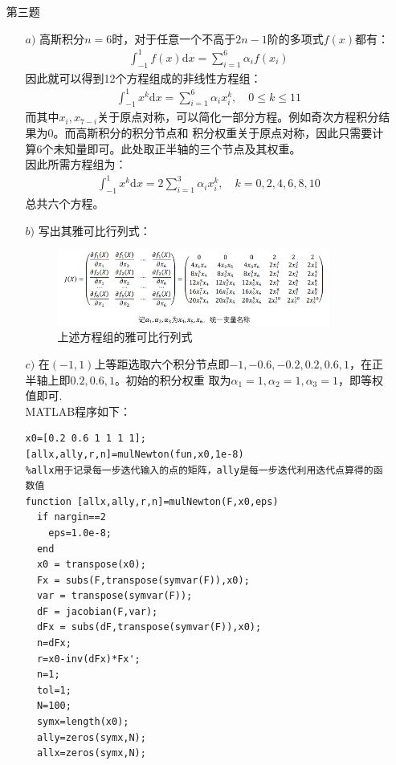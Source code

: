 \documentclass[12pt,a4paper,utf8]{ctexart}
\begin{document}
\begin{enumerate}
\begin{enumerate}
  \end{enumerate}


\item[第三题]
      \begin{enumerate}
        \item[$a)$] 高斯积分$n=6$时，对于任意一个不高于$2n-1$阶的多项式$f(x)$都有：
            \begin{eqnarray} 
                \int_{-1}^{1}f(x)\mathrm{d}x=\sum_{i=1}^{6}\alpha_{i}f(x_{i})
            \end{eqnarray}
            因此就可以得到12个方程组成的非线性方程组：
            \begin{eqnarray} 
                \int_{-1}^{1}x^{k}\mathrm{d}x=\sum_{i=1}^{6}\alpha_{i}x_{i}^{k}, \quad  0\leq k\leq 11
            \end{eqnarray}
            而其中$x_{i},x_{7-i}$关于原点对称，可以简化一部分方程。例如奇次方程积分结果为0。而高斯积分的积分节点和
            积分权重关于原点对称，因此只需要计算6个未知量即可。此处取正半轴的三个节点及其权重。\\
            因此所需方程组为：
            \begin{eqnarray} 
                \int_{-1}^{1}x^{k}\mathrm{d}x=2\sum_{i=1}^{3}\alpha_{i}x_{i}^{k}, \quad   k=0,2,4,6,8,10
            \end{eqnarray}
            总共六个方程。
        \item[$b)$] 写出其雅可比行列式：
            \begin{figure}[h]
                 \centering
                 \includegraphics[width=0.9\textwidth]{H3T3B.png}
                 \caption{上述方程组的雅可比行列式}
            \end{figure}
        \item[$c)$] 在$(-1,1)$上等距选取六个积分节点即$-1,-0.6,-0.2,0.2,0.6,1$，在正半轴上即$0.2,0.6,1$。初始的积分权重
                取为$\alpha_{1}=1,\alpha_{2}=1,\alpha_{3}=1$，即等权值即可.\\
                MATLAB程序如下：
            \begin{lstlisting}[frame=single]
x0=[0.2 0.6 1 1 1 1];
[allx,ally,r,n]=mulNewton(fun,x0,1e-8)
%allx用于记录每一步迭代输入的点的矩阵，ally是每一步迭代利用迭代点算得的函数值
function [allx,ally,r,n]=mulNewton(F,x0,eps)
  if nargin==2
    eps=1.0e-8;
  end
  x0 = transpose(x0);
  Fx = subs(F,transpose(symvar(F)),x0);
  var = transpose(symvar(F));
  dF = jacobian(F,var);
  dFx = subs(dF,transpose(symvar(F)),x0);
  n=dFx;
  r=x0-inv(dFx)*Fx';
  n=1;
  tol=1;
  N=100;
  symx=length(x0);
  ally=zeros(symx,N);
  allx=zeros(symx,N);


\end{lstlisting}
\end{enumerate}
\end{enumerate}
\end{document}

